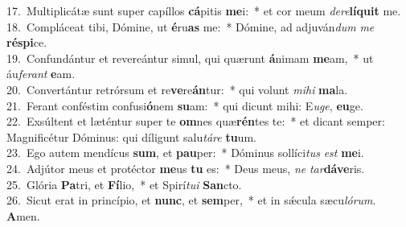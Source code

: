 {17.~}Multiplicátæ sunt super capíllos \textbf{cá}pitis \textbf{me}i:~* et cor meum \textit{de}\textit{re}\textbf{lí}\textbf{quit} me.\\
{18.~}Compláceat tibi, Dómine, ut \textbf{é}ru\textbf{as} me:~* Dómine, ad adjuván\textit{dum} \textit{me} \textbf{ré}\textbf{spi}ce.\\
{19.~}Confundántur et revereántur simul, qui quærunt \textbf{á}nimam \textbf{me}am,~* ut áu\textit{fe}\textit{rant} \textbf{e}am.\\
{20.~}Convertántur retrórsum et re\textbf{ve}re\textbf{án}tur:~* qui volunt \textit{mi}\textit{hi} \textbf{ma}la.\\
{21.~}Ferant conféstim confusi\textbf{ó}nem \textbf{su}am:~* qui dicunt mihi: E\textit{u}\textit{ge}, \textbf{e}\textbf{u}ge.\\
{22.~}Exsúltent et læténtur super te \textbf{om}nes quæ\textbf{rén}tes te:~* et dicant semper: Magnificétur Dóminus: qui díligunt salu\textit{tá}\textit{re} \textbf{tu}um.\\
{23.~}Ego autem mendícus \textbf{sum}, et \textbf{pau}per:~* Dóminus sollíci\textit{tus} \textit{est} \textbf{me}i.\\
{24.~}Adjútor meus et protéctor \textbf{me}us \textbf{tu} es:~* Deus meus, \textit{ne} \textit{tar}\textbf{dá}\textbf{ve}ris.\\
{25.~}Glória \textbf{Pa}tri, et \textbf{Fí}lio,~* et Spirí\textit{tu}\textit{i} \textbf{San}cto.\\
{26.~}Sicut erat in princípio, et \textbf{nunc}, et \textbf{sem}per,~* et in sǽcula sæcu\textit{ló}\textit{rum}. \textbf{A}men.\\
